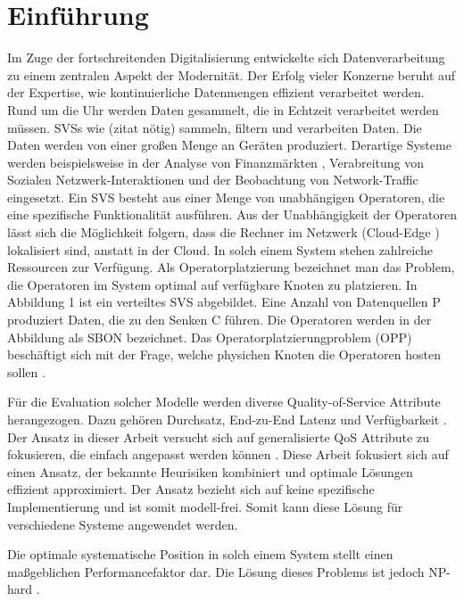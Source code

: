 \documentclass{article}
\begin{document}
\section{Einführung}
Im Zuge der fortschreitenden Digitalisierung entwickelte sich Datenverarbeitung zu einem zentralen Aspekt der Modernität.
Der Erfolg vieler Konzerne beruht auf der Expertise, wie kontinuierliche Datenmengen effizient verarbeitet werden.
Rund um die Uhr werden Daten gesammelt, die in Echtzeit verarbeitet werden müssen. 
SVSs wie (zitat nötig) sammeln, filtern und verarbeiten Daten. Die Daten werden von einer großen Menge an 
Geräten produziert. Derartige Systeme werden beispielsweise in der Analyse von Finanzmärkten \cite{k5}, 
Verabreitung von Sozialen Netzwerk-Interaktionen und der Beobachtung von Network-Traffic \cite{k5} 
eingesetzt. Ein SVS besteht aus einer Menge von unabhängigen Operatoren, die eine spezifische
Funktionalität ausführen. Aus der Unabhängigkeit der Operatoren lässt sich die Möglichkeit folgern, 
dass die Rechner im Netzwerk (Cloud-Edge \cite{k6}) lokalisiert sind, anstatt in der Cloud.
In solch einem System stehen zahlreiche Ressourcen zur Verfügung. 
Als Operatorplatzierung bezeichnet man das Problem, 
die Operatoren im System optimal auf verfügbare Knoten zu platzieren.
In Abbildung 1 ist ein verteiltes SVS abgebildet. Eine Anzahl von Datenquellen P produziert Daten, die zu den Senken C führen. Die Operatoren 
werden in der Abbildung als SBON bezeichnet. Das Operatorplatzierungproblem (OPP) beschäftigt sich mit der Frage, 
welche physichen Knoten die Operatoren hosten sollen \cite{network-aware-op}. 

Für die Evaluation solcher Modelle werden diverse Quality-of-Service Attribute herangezogen. 
Dazu gehören Durchsatz, End-zu-End Latenz und Verfügbarkeit \cite{efficient-operator-placement} \cite{cardellini-optimal_operatorplc}.  Der Ansatz in dieser Arbeit versucht sich auf generalisierte QoS Attribute 
zu fokusieren, die einfach angepasst werden können \cite{efficient-operator-placement}.
Diese Arbeit fokusiert sich auf einen Ansatz, der bekannte Heurisiken kombiniert und optimale Lösungen effizient approximiert. Der Ansatz bezieht sich auf keine spezifische
Implementierung und ist somit modell-frei. Somit kann diese Lösung für verschiedene Systeme angewendet werden.

Die optimale systematische Position in solch einem System stellt einen maßgeblichen Performancefaktor dar. 
Die Lösung dieses Problems ist jedoch NP-hard \cite{cardellini-optimal_operatorplc}.
\end{document}
